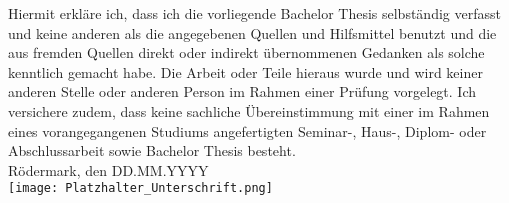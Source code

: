 Hiermit erkläre ich, dass ich die vorliegende Bachelor Thesis selbständig verfasst und keine anderen als die angegebenen Quellen und Hilfsmittel benutzt und die aus fremden Quellen direkt oder indirekt übernommenen Gedanken als solche kenntlich gemacht habe. Die Arbeit oder Teile hieraus wurde und wird keiner anderen Stelle oder anderen Person im Rahmen einer Prüfung vorgelegt. Ich versichere zudem, dass keine sachliche Übereinstimmung mit einer im Rahmen eines vorangegangenen Studiums angefertigten Seminar-, Haus-, Diplom- oder Abschlussarbeit sowie Bachelor Thesis besteht.
\\ [1.2em]
Rödermark, den DD.MM.YYYY%
\\ [1.2em]
\texttt{[image: Platzhalter\_Unterschrift.png]}%